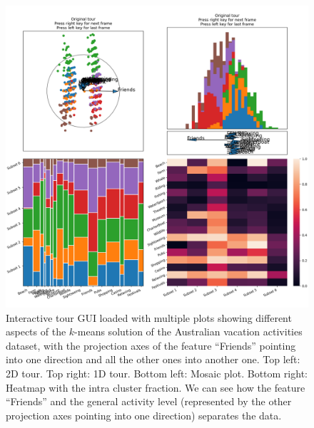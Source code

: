 \documentclass[article]{ajs}
\begin{document}
\begin{figure}[h!]
    \centering
    \includegraphics[width=1\textwidth]{aus_preselection.png}
    \caption{Interactive tour GUI loaded with multiple plots showing different aspects of the $k$-means solution of the Australian vacation activities dataset, with the projection axes of the feature ``Friends'' pointing into one direction and all the other ones into another one. Top left: 2D tour. Top right: 1D tour. Bottom left: Mosaic plot. Bottom right: Heatmap with the intra cluster fraction. We can see how the feature ``Friends'' and the general activity level (represented by the other projection axes pointing into one direction) separates the data.}
    \label{fig:aus_preselection}
\end{figure}
\end{document}
